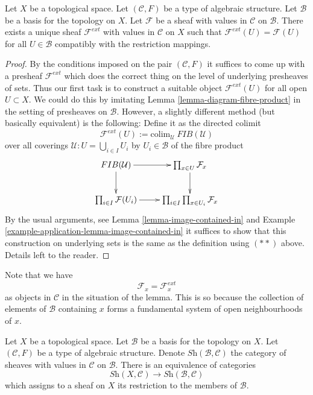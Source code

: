 \begin{lemma}
\label{lemma-extend-off-basis-structures}
Let $X$ be a topological space. Let $(\mathcal{C}, F)$ be
a type of algebraic structure.
Let $\mathcal{B}$ be a basis for the topology on $X$.
Let $\mathcal{F}$ be a sheaf with values in $\mathcal{C}$
on $\mathcal{B}$.
There exists a unique sheaf $\mathcal{F}^{ext}$ with values in $\mathcal{C}$
on $X$ such that $\mathcal{F}^{ext}(U) = \mathcal{F}(U)$
for all $U \in \mathcal{B}$ compatibly with the restriction
mappings.
\end{lemma}

\begin{proof}
By the conditions imposed on the pair $(\mathcal{C}, F)$ it
suffices to come up with a presheaf $\mathcal{F}^{ext}$
which does the correct thing on the level of underlying
presheaves of sets. Thus our first task is to construct
a suitable object $\mathcal{F}^{ext}(U)$ for all open $U \subset X$.
We could do this by imitating
Lemma \ref{lemma-diagram-fibre-product} in the setting
of presheaves on $\mathcal{B}$. However, a slightly different method
(but basically equivalent) is the following:
Define it as the directed colimit
$$
\mathcal{F}^{ext}(U)
:=
\text{colim}_{\mathcal{U}}\ FIB(\mathcal{U})
$$
over all coverings
$\mathcal{U} : U = \bigcup_{i\in I} U_i$ by $U_i \in \mathcal{B}$
of the fibre product
$$
\xymatrix{
FIB(\mathcal{U}) \ar[r] \ar[d] &
\prod\nolimits_{x\in U} \mathcal{F}_x \ar[d] \\
\prod\nolimits_{i\in I} \mathcal{F}(U_i) \ar[r] &
\prod\nolimits_{i \in I} \prod\nolimits_{x\in U_i} \mathcal{F}_x
}
$$
By the usual arguments, see Lemma \ref{lemma-image-contained-in}
and Example \ref{example-application-lemma-image-contained-in}
it suffices to show that this construction on underlying
sets is the same as the definition using $(**)$ above.
Details left to the reader.
\end{proof}

\noindent
Note that we have
$$
\mathcal{F}_x = \mathcal{F}_x^{ext}
$$
as objects in $\mathcal{C}$
in the situation of the lemma. This is so because the
collection of elements of $\mathcal{B}$ containing
$x$ forms a fundamental system of open neighbourhoods of $x$.

\begin{lemma}
\label{lemma-restrict-basis-equivalence-structures}
Let $X$ be a topological space.
Let $\mathcal{B}$ be a basis for the topology on $X$.
Let $(\mathcal{C}, F)$ be a type of algebraic structure.
Denote $\textit{Sh}(\mathcal{B}, \mathcal{C})$ the category of
sheaves with values in $\mathcal{C}$ on $\mathcal{B}$.
There is an equivalence of categories
$$
\textit{Sh}(X, \mathcal{C})
\longrightarrow
\textit{Sh}(\mathcal{B}, \mathcal{C})
$$
which assigns to a sheaf on $X$ its restriction to
the members of $\mathcal{B}$.
\end{lemma}

